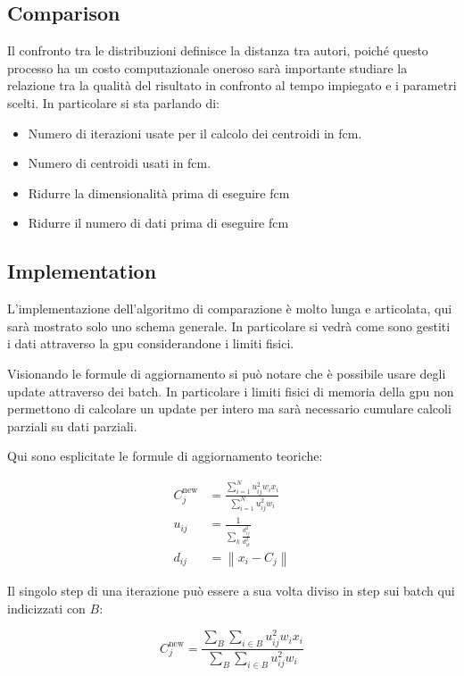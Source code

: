 \begin{toDo}
    \section{Comparison}
    Il confronto tra le distribuzioni definisce la distanza tra autori, poiché questo processo ha un costo computazionale oneroso sarà importante studiare la relazione tra la qualità del risultato in confronto al tempo impiegato e i parametri scelti. In particolare si sta parlando di:
    \begin{itemize}
    	\item Numero di iterazioni usate per il calcolo dei centroidi in \gls{fcm}.
    	\item Numero di centroidi usati in \gls{fcm}.
    	\item Ridurre la dimensionalità prima di eseguire \gls{fcm}
    	\item Ridurre il numero di dati prima di eseguire \gls{fcm}
    \end{itemize}

	\subsection{Implementation}
	L'implementazione dell'algoritmo di comparazione è molto lunga e articolata, qui sarà mostrato solo uno schema generale. In particolare si vedrà come sono gestiti i dati attraverso la \gls{gpu} considerandone i limiti fisici.


	\noindent Visionando le formule di aggiornamento si può notare che è possibile usare degli update attraverso dei batch. In particolare i limiti fisici di memoria della \gls{gpu} non permettono di calcolare un update per intero ma sarà necessario cumulare calcoli parziali su dati parziali.

	\noindent Qui sono esplicitate le formule di aggiornamento teoriche:

	\begin{align*}
		C_{j}^\text{new} &= \frac{\sum_{i=1}^N u_{ij}^2w_ix_i}{\sum_{i=1}^N u_{ij}^2w_i} \\
		u_{ij} &= \frac{1}{\sum_k\frac{d_{ij}^2}{d_{ik}^2}} \\
		d_{ij} &= \left\|x_i - C_{j}\right\|
	\end{align*}

	\noindent Il singolo step di una iterazione può essere a sua volta diviso in step sui batch qui indicizzati con $B$:

	\begin{equation*}
		C_{j}^\text{new} = \frac{\sum_{B}\sum_{i\in B} u_{ij}^2w_ix_i}{\sum_{B}\sum_{i\in B} u_{ij}^2w_i}
	\end{equation*}


\end{toDo}

